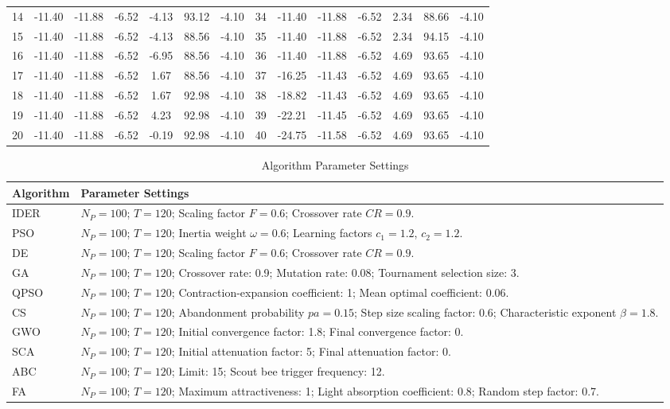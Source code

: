 \documentclass[lettersize,onecolumn]{IEEEtran}
\begin{document}
\begin{table}[!htb]
\begin{tabular}{c cccccc|c cccccc}
		14 & -11.40 & -11.88 & -6.52 & -4.13 & 93.12 & -4.10 & 34 & -11.40 & -11.88 & -6.52 & 2.34  & 88.66 & -4.10 \\
		15 & -11.40 & -11.88 & -6.52 & -4.13 & 88.56 & -4.10 & 35 & -11.40 & -11.88 & -6.52 & 2.34  & 94.15 & -4.10 \\
		16 & -11.40 & -11.88 & -6.52 & -6.95 & 88.56 & -4.10 & 36 & -11.40 & -11.88 & -6.52 & 4.69  & 93.65 & -4.10 \\
		17 & -11.40 & -11.88 & -6.52 & 1.67  & 88.56 & -4.10 & 37 & -16.25 & -11.43 & -6.52 & 4.69  & 93.65 & -4.10 \\
		18 & -11.40 & -11.88 & -6.52 & 1.67  & 92.98 & -4.10 & 38 & -18.82 & -11.43 & -6.52 & 4.69  & 93.65 & -4.10 \\
		19 & -11.40 & -11.88 & -6.52 & 4.23  & 92.98 & -4.10 & 39 & -22.21 & -11.45 & -6.52 & 4.69  & 93.65 & -4.10 \\
		20 & -11.40 & -11.88 & -6.52 & -0.19 & 92.98 & -4.10 & 40 & -24.75 & -11.58 & -6.52 & 4.69  & 93.65 & -4.10 \\
		\bottomrule
	\end{tabular}
\end{table}

\renewcommand{\thetable}{S.II}
\begin{table}[!htb]
	\caption{Algorithm Parameter Settings}
	\label{tab2}
	\centering
	\footnotesize
	\begin{tabular}{lp{}}
		\toprule
		Algorithm & Parameter Settings \\
		\midrule
		IDER & \(N_P = 100\); \(T = 120\); Scaling factor \(F = 0.6\); Crossover rate \(CR = 0.9\). \\
		PSO  & \(N_P = 100\); \(T = 120\); Inertia weight \(\omega = 0.6\); Learning factors \(c_1 = 1.2\), \(c_2 = 1.2\). \\
		DE   & \(N_P = 100\); \(T = 120\); Scaling factor \(F = 0.6\); Crossover rate \(CR = 0.9\). \\
		GA   & \(N_P = 100\); \(T = 120\); Crossover rate: 0.9; Mutation rate: 0.08; Tournament selection size: 3. \\
		QPSO & \(N_P = 100\); \(T = 120\); Contraction-expansion coefficient: 1; Mean optimal coefficient: 0.06. \\
		CS   & \(N_P = 100\); \(T = 120\); Abandonment probability \(pa = 0.15\); Step size scaling factor: 0.6; Characteristic exponent \(\beta = 1.8\). \\
		GWO  & \(N_P = 100\); \(T = 120\); Initial convergence factor: 1.8; Final convergence factor: 0. \\
		SCA  & \(N_P = 100\); \(T = 120\); Initial attenuation factor: 5; Final attenuation factor: 0. \\
		ABC  & \(N_P = 100\); \(T = 120\); Limit: 15; Scout bee trigger frequency: 12. \\
		FA   & \(N_P = 100\); \(T = 120\); Maximum attractiveness: 1; Light absorption coefficient: 0.8; Random step factor: 0.7. \\
		\bottomrule
	\end{tabular}
\end{table}
\end{document}

